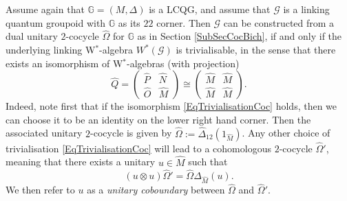 \documentclass[reqno]{amsart}
\numberwithin{equation}{section}
\newcommand{\G}{\mathbb{G}}
\newcommand{\msG}{\mathscr{G}}
\begin{document}
Assume again that $\G = (M,\Delta)$ is a LCQG, and assume that $\msG$ is a linking quantum groupoid with $\G$ as its $22$ corner. Then $\msG$ can be constructed from a dual unitary $2$-cocycle $\hat{\Omega}$ for $\G$ as in Section \ref{SubSecCocBich}, if and only if the underlying linking W$^*$-algebra $W^*(\msG)$ is trivialisable, in the sense that there exists an isomorphism of W$^*$-algebras (with projection) 
\begin{equation}\label{EqTrivialisationCoc}
\hat{Q} = \begin{pmatrix} \hat{P} & \hat{N}\\ \hat{O} & \hat{M}\end{pmatrix} \cong \begin{pmatrix} \hat{M}& \hat{M}\\ \hat{M}&\hat{M}\end{pmatrix}.
\end{equation}
Indeed, note first that if the isomorphism \eqref{EqTrivialisationCoc} holds, then we can choose it to be an identity on the lower right hand corner. Then the associated unitary $2$-cocycle is given by $\hat{\Omega} := \hat{\Delta}_{12}(1_{\hat{M}})$. Any other choice of trivialisation \eqref{EqTrivialisationCoc} will lead to a cohomologous $2$-cocycle $\hat{\Omega}'$, meaning that there exists a unitary $u\in \hat{M}$ such that 
\begin{equation}\label{eq7}
(u\otimes u)\hat{\Omega}' = \hat{\Omega}\Delta_{\hat{M}}(u). 
\end{equation}
We then refer to $u$ as a \emph{unitary coboundary} between $\hat{\Omega}$ and $\hat{\Omega}'$. 
\end{document}
